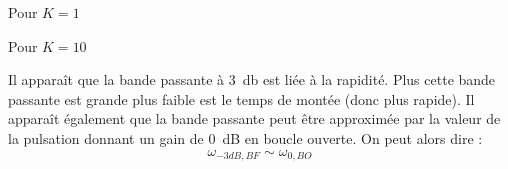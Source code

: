 Pour $K=1$
\begin{center}
    
\end{center}
Pour $K=10$
\begin{center}
    
\end{center}
\clearpage
Il apparaît que la bande passante à \SI{3}{\decibel} est liée à la rapidité. 
Plus cette bande passante est grande plus faible est le temps de montée (donc 
plus rapide). Il apparaît également que la bande passante peut être approximée 
par la valeur de la pulsation donnant un gain de \SI{0}{\dB} en boucle ouverte. 
On peut alors dire :
\[
\omega_{-3dB,BF}\sim\omega_{0,BO}
\]


